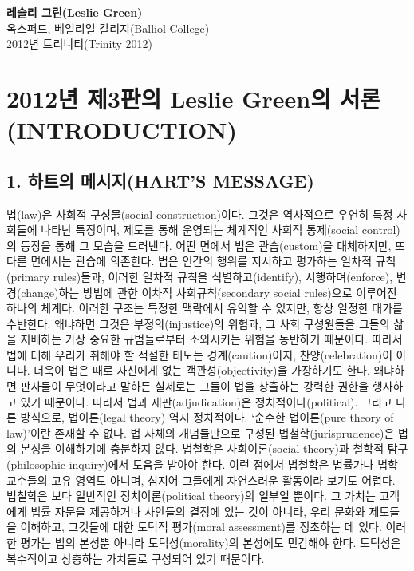 \documentclass[12pt, oneside]{book}  %
\begin{document}
\vspace{1em}

\begin{flushright}
\textbf{레슬리 그린(Leslie Green)} 
\\ 옥스퍼드, 베일리얼 칼리지(Balliol College) 
\\ 2012년 트리니티(Trinity 2012)
\end{flushright}

\newpage

\section{2012년 제3판의 Leslie Green의
서론(INTRODUCTION)}\label{uxb144-uxc81c3uxd310uxc758-leslie-greenuxc758-uxc11cuxb860introduction}

\subsection{\texorpdfstring{\textbf{1. 하트의 메시지(HART'S
MESSAGE)}}{1. 하트의 메시지(HART'S MESSAGE)}}\label{uxd558uxd2b8uxc758-uxba54uxc2dcuxc9c0harts-message}

법(law)은 사회적 구성물(social construction)이다. 그것은 역사적으로
우연히 특정 사회들에 나타난 특징이며, 제도를 통해 운영되는 체계적인
사회적 통제(social control)의 등장을 통해 그 모습을 드러낸다. 어떤
면에서 법은 관습(custom)을 대체하지만, 또 다른 면에서는 관습에 의존한다.
법은 인간의 행위를 지시하고 평가하는 일차적 규칙(primary rules)들과,
이러한 일차적 규칙을 식별하고(identify), 시행하며(enforce),
변경(change)하는 방법에 관한 이차적 사회규칙(secondary social rules)으로
이루어진 하나의 체계다. 이러한 구조는 특정한 맥락에서 유익할 수 있지만,
항상 일정한 대가를 수반한다. 왜냐하면 그것은 부정의(injustice)의 위험과,
그 사회 구성원들을 그들의 삶을 지배하는 가장 중요한 규범들로부터
소외시키는 위험을 동반하기 때문이다. 따라서 법에 대해 우리가 취해야 할
적절한 태도는 경계(caution)이지, 찬양(celebration)이 아니다. 더욱이 법은
때로 자신에게 없는 객관성(objectivity)을 가장하기도 한다. 왜냐하면
판사들이 무엇이라고 말하든 실제로는 그들이 법을 창출하는 강력한 권한을
행사하고 있기 때문이다. 따라서 법과 재판(adjudication)은
정치적이다(political). 그리고 다른 방식으로, 법이론(legal theory) 역시
정치적이다. `순수한 법이론(pure theory of law)'이란 존재할 수 없다. 법
자체의 개념들만으로 구성된 법철학(jurisprudence)은 법의 본성을
이해하기에 충분하지 않다. 법철학은 사회이론(social theory)과 철학적
탐구(philosophic inquiry)에서 도움을 받아야 한다. 이런 점에서 법철학은
법률가나 법학 교수들의 고유 영역도 아니며, 심지어 그들에게 자연스러운
활동이라 보기도 어렵다. 법철학은 보다 일반적인 정치이론(political
theory)의 일부일 뿐이다. 그 가치는 고객에게 법률 자문을 제공하거나
사안들의 결정에 있는 것이 아니라, 우리 문화와 제도들을 이해하고,
그것들에 대한 도덕적 평가(moral assessment)를 정초하는 데 있다. 이러한
평가는 법의 본성뿐 아니라 도덕성(morality)의 본성에도 민감해야 한다.
도덕성은 복수적이고 상충하는 가치들로 구성되어 있기 때문이다.
\end{document}
